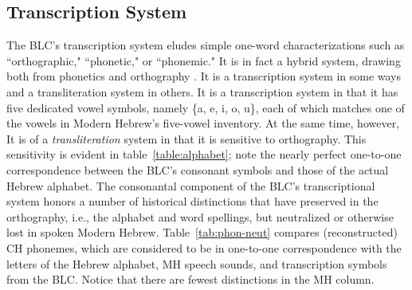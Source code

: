 
\subsection{Transcription System}\label{sec:transcription}
The BLC's transcription system eludes simple one-word characterizations 
such as ``orthographic,"
``phonetic," or ``phonemic." It is in fact a hybrid system, drawing
both from phonetics and orthography \citep{albert-et-al:2013}. It is a transcription system
in some ways and a transliteration system in others.
It is a transcription system in that it has five dedicated vowel symbols, 
namely \{a, e, i, o, u\}, each of which matches one of the vowels in Modern 
Hebrew's five-vowel inventory. %
At the same time, however, 
It is  of a \emph{transliteration} system in that it is sensitive to orthography. This sensitivity is evident in 
table~\ref{table:alphabet}; note the nearly perfect one-to-one correspondence between the BLC's consonant 
symbols and those of the actual Hebrew alphabet. The consonantal component of the BLC's transcriptional system 
honors a number of historical distinctions that have preserved in the orthography, i.e., the alphabet and word 
spellings, but neutralized or otherwise lost in spoken Modern Hebrew. Table~\ref{tab:phon-neut} compares 
(reconstructed) CH phonemes, which are considered to be in one-to-one correspondence with the letters of 
the Hebrew alphabet, MH speech sounds, and transcription symbols from the BLC. Notice that there are fewest distinctions
in the MH column.


